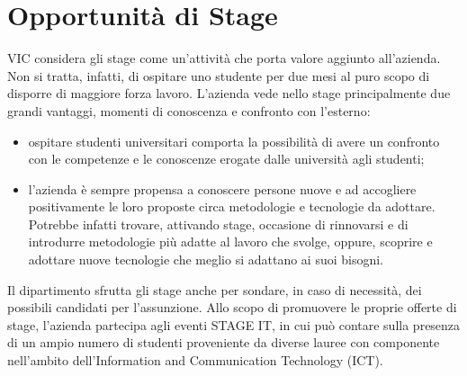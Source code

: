 \section{Opportunità di Stage} %
	VIC considera gli stage come un’attività che porta valore aggiunto all’azienda.
	Non si tratta, infatti, di ospitare uno studente per due mesi al puro scopo di disporre di
	maggiore forza lavoro. L’azienda vede nello stage principalmente due grandi vantaggi,
	momenti di conoscenza e confronto con l’esterno:
	\begin{itemize}
		\item ospitare studenti universitari comporta la possibilità di avere un confronto con
			le competenze e le conoscenze erogate dalle università agli studenti;
		\item l’azienda è sempre propensa a conoscere persone nuove e ad accogliere positivamente
			le loro proposte circa metodologie e tecnologie da adottare. Potrebbe
			infatti trovare, attivando stage, occasione di rinnovarsi e di introdurre metodologie
			più adatte al lavoro che svolge, oppure, scoprire e adottare nuove tecnologie
			che meglio si adattano ai suoi bisogni.
	\end{itemize}
	
	Il dipartimento sfrutta gli stage anche per sondare, in caso di necessità, dei possibili
	candidati per l’assunzione. Allo scopo di promuovere le proprie offerte di stage, l’azienda
	partecipa agli eventi STAGE IT, in cui può contare sulla presenza di un ampio numero
	di studenti proveniente da diverse lauree con componente nell’ambito dell’Information
	and Communication Technology (ICT).